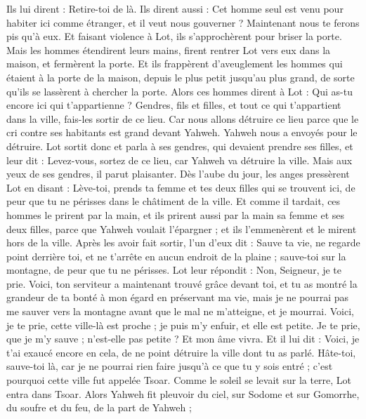 \begin{multicols}{2}
Ils lui dirent : Retire-toi de là. Ils dirent aussi : Cet homme seul est venu pour habiter ici comme étranger, et il veut nous gouverner ? Maintenant nous te ferons pis qu'à eux. Et faisant violence à Lot, ils s'approchèrent pour briser la porte.
Mais les hommes étendirent leurs mains, firent rentrer Lot vers eux dans la maison, et fermèrent la porte.
Et ils frappèrent d'aveuglement les hommes qui étaient à la porte de la maison, depuis le plus petit jusqu'au plus grand, de sorte qu'ils se lassèrent à chercher la porte.
Alors ces hommes dirent à Lot : Qui as-tu encore ici qui t'appartienne ? Gendres, fils et filles, et tout ce qui t'appartient dans la ville, fais-les sortir de ce lieu.
Car nous allons détruire ce lieu parce que le cri contre ses habitants est grand devant Yahweh. Yahweh nous a envoyés pour le détruire.
Lot sortit donc et parla à ses gendres, qui devaient prendre ses filles, et leur dit : Levez-vous, sortez de ce lieu, car Yahweh va détruire la ville. Mais aux yeux de ses gendres, il parut plaisanter.
Dès l'aube du jour, les anges pressèrent Lot en disant : Lève-toi, prends ta femme et tes deux filles qui se trouvent ici, de peur que tu ne périsses dans le châtiment de la ville.
Et comme il tardait, ces hommes le prirent par la main, et ils prirent aussi par la main sa femme et ses deux filles, parce que Yahweh voulait l'épargner ; et ils l'emmenèrent et le mirent hors de la ville.
Après les avoir fait sortir, l'un d'eux dit : Sauve ta vie, ne regarde point derrière toi, et ne t'arrête en aucun endroit de la plaine ; sauve-toi sur la montagne, de peur que tu ne périsses.
Lot leur répondit : Non, Seigneur, je te prie.
Voici, ton serviteur a maintenant trouvé grâce devant toi, et tu as montré la grandeur de ta bonté à mon égard en préservant ma vie, mais je ne pourrai pas me sauver vers la montagne avant que le mal ne m'atteigne, et je mourrai.
Voici, je te prie, cette ville-là est proche ; je puis m'y enfuir, et elle est petite. Je te prie, que je m'y sauve ; n'est-elle pas petite ? Et mon âme vivra.
Et il lui dit : Voici, je t'ai exaucé encore en cela, de ne point détruire la ville dont tu as parlé.
Hâte-toi, sauve-toi là, car je ne pourrai rien faire jusqu'à ce que tu y sois entré ; c'est pourquoi cette ville fut appelée Tsoar.
Comme le soleil se levait sur la terre, Lot entra dans Tsoar.
Alors Yahweh fit pleuvoir du ciel, sur Sodome et sur Gomorrhe, du soufre et du feu, de la part de Yahweh ;

\end{multicols}
